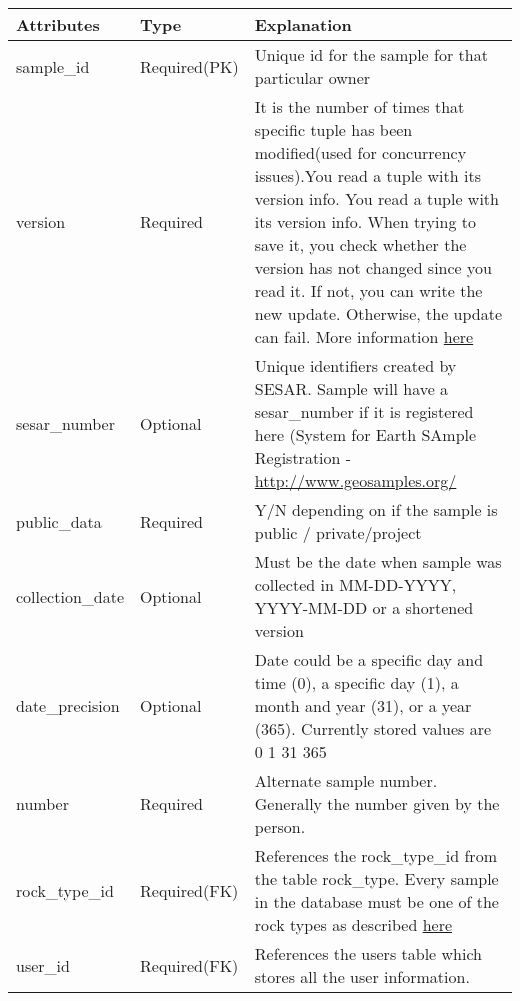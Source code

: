 \documentclass[letterpaper,10pt,english]{sphinxmanual}
\begin{document}
\begin{tabulary}{\linewidth}{|L|L|L|}
\hline
\textbf{
Attributes
} & \textbf{
Type
} & \textbf{
Explanation
}\\\hline

sample\_id
 & 
Required(PK)
 & 
Unique id for the sample for that particular owner
\\\hline

version
 & 
Required
 & 
It is the number of times that specific tuple has been modified(used
for concurrency issues).You read a tuple with its version info. You
read a tuple with its version info. When trying to save it, you check
whether the version has not changed since you read it. If not, you
can write the new update. Otherwise, the update can fail. More
information \href{http://wiki.cs.rpi.edu/trac/metpetdb/wiki/Versioning}{here}
\\\hline

sesar\_number
 & 
Optional
 & 
Unique identifiers created by SESAR. Sample will have a sesar\_number if
it is registered here (System for Earth SAmple Registration -
\href{http://www.geosamples.org/}{http://www.geosamples.org/}
\\\hline

public\_data
 & 
Required
 & 
Y/N depending on if the sample is public /
private/project
\\\hline

collection\_date
 & 
Optional
 & 
Must be the date when sample was collected in MM-DD-YYYY, YYYY-MM-DD
or a shortened version
\\\hline

date\_precision
 & 
Optional
 & 
Date could be a specific day and time (0), a specific day (1), a month
and year (31), or a year (365). Currently stored values
are 0 1 31 365
\\\hline

number
 & 
Required
 & 
Alternate sample number. Generally the number given by the person.
\\\hline

rock\_type\_id
 & 
Required(FK)
 & 
References the rock\_type\_id from the table rock\_type. Every sample in the
database must be one of the rock types as described \href{http://wiki.cs.rpi.edu/trac/metpetdb/wiki/RockType}{here}
\\\hline

user\_id
 & 
Required(FK)
 & 
References the users table  which stores all the user information.
\\\hline


\end{tabulary}
\end{document}
